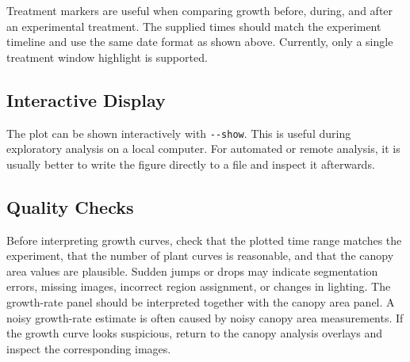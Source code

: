 Treatment markers are useful when comparing growth before, during, and after an
experimental treatment. The supplied times should match the experiment timeline
and use the same date format as shown above. Currently, only a single treatment
window highlight is supported. 

\subsection{Interactive Display}

The plot can be shown interactively with \verb|--show|. This is useful during
exploratory analysis on a local computer. For automated or remote analysis, it
is usually better to write the figure directly to a file and inspect it
afterwards.

\subsection{Quality Checks}

Before interpreting growth curves, check that the plotted time range matches
the experiment, that the number of plant curves is reasonable, and that the
canopy area values are plausible. Sudden jumps or drops may indicate
segmentation errors, missing images, incorrect region assignment, or changes in
lighting. The growth-rate panel should be interpreted together with the canopy
area panel. A noisy growth-rate estimate is often caused by noisy canopy area
measurements. If the growth curve looks suspicious, return to the canopy
analysis overlays and inspect the corresponding images.

